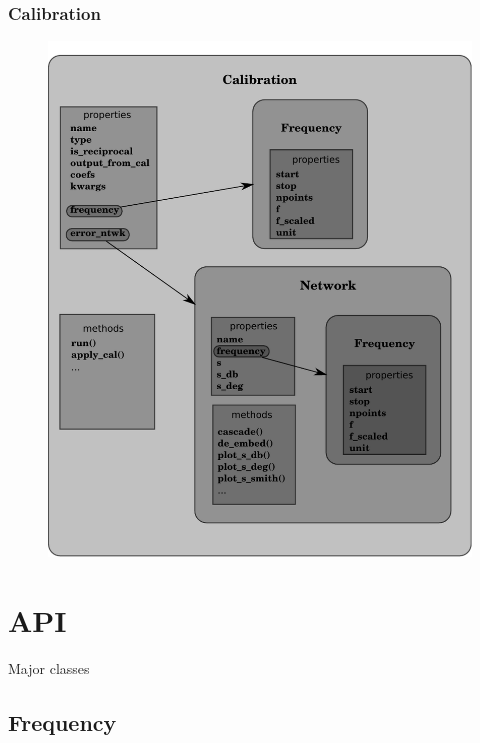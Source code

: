 \documentclass[letterpaper,10pt,english]{sphinxmanual}
\begin{document}
\subsection{Calibration}
\label{architecture:calibration}\begin{figure}[htbp]
\centering

\includegraphics{calibration.pdf}
\end{figure}


\chapter{API}
\label{api:api}\label{api::doc}\label{api:id1}
Major classes


\section{Frequency}
\label{auto_frequency:frequency}\label{auto_frequency::doc}
\end{document}
